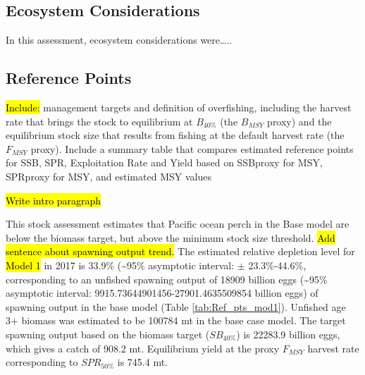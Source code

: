 \documentclass[12pt,]{article}
\begin{document}
\FloatBarrier

\subsection*{Ecosystem Considerations}\label{ecosystem-considerations}

In this assessment, ecosystem considerations were\ldots{}..

\subsection*{Reference Points}\label{reference-points}

\hl{Include:} management targets and definition of overfishing,
including the harvest rate that brings the stock to equilibrium at
\(B_{40\%}\) (the \(B_{MSY}\) proxy) and the equilibrium stock size that
results from fishing at the default harvest rate (the \(F_{MSY}\)
proxy). Include a summary table that compares estimated reference points
for SSB, SPR, Exploitation Rate and Yield based on SSBproxy for MSY,
SPRproxy for MSY, and estimated MSY values

\hl{Write intro paragraph}

This stock assessment estimates that Pacific ocean perch in the Base
model are below the biomass target, but above the minimum stock size
threshold. \hl{Add sentence about spawning output trend.} The estimated
relative depletion level for \hl{Model 1} in 2017 is 33.9\%
(\textasciitilde{}95\% asymptotic interval: \(\pm\) 23.3\%-44.6\%,
corresponding to an unfished spawning output of 18909 billion eggs
(\textasciitilde{}95\% asymptotic interval:
9915.73644901456-27901.4635509854 billion eggs) of spawning output in
the base model (Table \ref{tab:Ref_pts_mod1}). Unfished age 3+ biomass
was estimated to be 100784 mt in the base case model. The target
spawning output based on the biomass target (\(SB_{40\%}\)) is 22283.9
billion eggs, which gives a catch of 908.2 mt. Equilibrium yield at the
proxy \(F_{MSY}\) harvest rate corresponding to \(SPR_{50\%}\) is 745.4
mt.

\FloatBarrier
\end{document}
